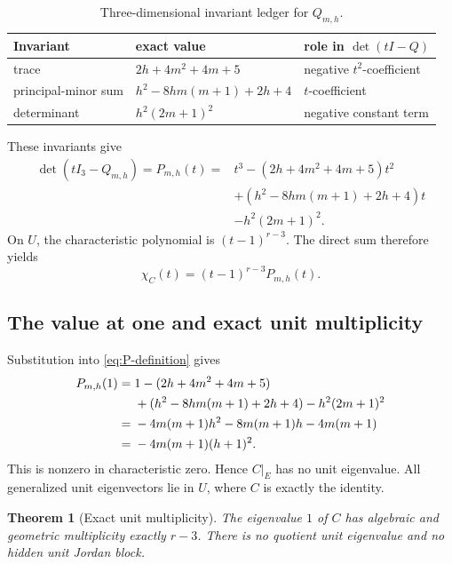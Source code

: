 \documentclass[11pt]{article}
\newtheorem{theorem}{Theorem}[section]
\theoremstyle{remark}
\numberwithin{equation}{section}
\begin{document}
\begin{table}[ht]
\centering
\small
\caption{Three-dimensional invariant ledger for \(Q_{m,h}\).}
\label{tab:invariant-ledger}
\begin{tabularx}{\textwidth}{@{}p{}X p{}@{}}
\toprule
Invariant & exact value & role in \(\det(tI-Q)\) \\
\midrule
trace & \(2h+4m^2+4m+5\) & negative \(t^2\)-coefficient \\
principal-minor sum & \(h^2-8hm(m+1)+2h+4\) & \(t\)-coefficient \\
determinant & \(h^2(2m+1)^2\) & negative constant term \\
\bottomrule
\end{tabularx}
\end{table}

These invariants give
\begin{equation}\label{eq:P-definition}
\begin{aligned}
\det(tI_3-Q_{m,h})
=P_{m,h}(t)
={}&t^3-(2h+4m^2+4m+5)t^2\\
&+(h^2-8hm(m+1)+2h+4)t\\
&-h^2(2m+1)^2.
\end{aligned}
\end{equation}
On \(U\), the characteristic polynomial is \((t-1)^{r-3}\).  The direct
sum therefore yields
\begin{equation}\label{eq:chi-factorization}
\chi_C(t)=(t-1)^{r-3}P_{m,h}(t).
\end{equation}

\subsection{The value at one and exact unit multiplicity}

Substitution into \eqref{eq:P-definition} gives
\begin{align}
P_{m,h}(1)
={}&1-(2h+4m^2+4m+5) \notag\\
&+(h^2-8hm(m+1)+2h+4)-h^2(2m+1)^2 \notag\\
= {}&-4m(m+1)h^2-8m(m+1)h-4m(m+1) \notag\\
= {}&-4m(m+1)(h+1)^2.
\label{eq:P-one}
\end{align}
This is nonzero in characteristic zero.  Hence \(C|_E\) has no unit
eigenvalue.  All generalized unit eigenvectors lie in \(U\), where \(C\)
is exactly the identity.

\begin{theorem}[Exact unit multiplicity]\label{thm:unit-multiplicity}
The eigenvalue \(1\) of \(C\) has algebraic and geometric multiplicity
exactly \(r-3\).  There is no quotient unit eigenvalue and no hidden unit
Jordan block.
\end{theorem}
\end{document}
